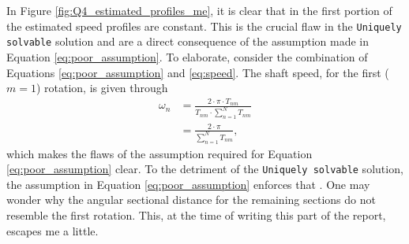 \documentclass{article}
\begin{document}
	In Figure \ref{fig:Q4_estimated_profiles_me}, it is clear that in the first portion of the estimated speed profiles are constant. This is the crucial flaw in the \texttt{Uniquely solvable} solution and are a direct consequence of the assumption made in Equation \eqref{eq:poor_assumption}. To elaborate, consider the combination of Equations \eqref{eq:poor_assumption}  and \eqref{eq:speed}. The shaft speed, for the first ($m=1$) rotation, is given through
	\begin{equation}
		\begin{aligned}
			\omega_n &= \frac{2\cdot\pi \cdot T_{nm}}{T_{nm}\cdot \sum_{n=1}^{N}T_{nm}} \\
			&= \frac{2\cdot\pi}{\sum_{n=1}^{N}T_{nm}},
		\end{aligned}
	\end{equation}
	which makes the flaws of the assumption required for Equation \eqref{eq:poor_assumption} clear. To the detriment of the \texttt{Uniquely solvable} solution, the assumption in Equation \eqref{eq:poor_assumption} enforces that . One may wonder why the angular sectional distance for the remaining sections do not resemble the first rotation. This, at the time of writing this part of the report, escapes me a little. 
\end{document}
